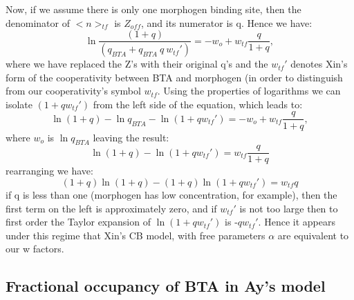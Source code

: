 Now, if we assume there is only one morphogen binding site, then the denominator of $< n >_{tf} $ is $Z_{off}$, and its numerator is q.  Hence we have:
\begin{equation}
\ln{\frac{(1+q)}{(q_{BTA} +q_{BTA} \ q \ w_{tf}')}} = -w_o +  w_{tf}\frac{q}{1+q},
\end{equation}
where we have replaced the Z's with their original q's and the $w_{tf}'$ denotes Xin's form of the cooperativity between BTA and morphogen (in order to distinguish from our cooperativity's symbol $w_{tf}$.  Using the properties of logarithms we can isolate $(1+q w_{tf}')$ from the left side of the equation, which leads to:
\begin{equation}
\ln{(1+q)} - \ln{q_{BTA}} - \ln{(1+qw_{tf}')} = -w_o +  w_{tf}\frac{q}{1+q},
\end{equation}
where $w_o$ is $\ln{q_{BTA}}$ leaving the result:
\begin{equation}
\ln{(1+q)} - \ln{(1+qw_{tf}')}=w_{tf}\frac{q}{1+q}
\end{equation}
rearranging we have:
\begin{equation}
(1+q)\ln{(1+q)} - (1+q)\ln{(1+qw_{tf}')}=w_{tf}{q}
\end{equation}
if q is less than one (morphogen has low concentration, for example), then the first term on the left is approximately zero, and if $w_{tf}'$ is not too large then to first order the Taylor expansion of $\ln(1+qw_{tf}')$ is -$qw_{tf}'$.  Hence it appears under this regime that Xin's CB model, with free parameters $\alpha$ are equivalent to our w factors.

\subsection{Fractional occupancy of BTA in Ay's model}

